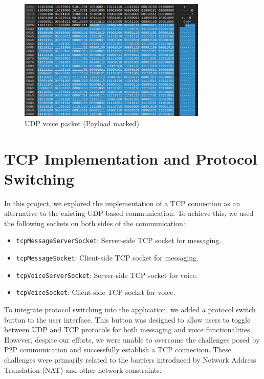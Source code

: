 \documentclass{article}
\begin{document}
\begin{figure}[h!]
    \centering
    \includegraphics[width=0.8\textwidth]{udp-voice-3.png}
    \caption{UDP voice packet (Payload marked)}
    \label{fig:udp-voice-3}
\end{figure}

\section{TCP Implementation and Protocol Switching}

In this project, we explored the implementation of a TCP connection as an alternative to the existing UDP-based communication. To achieve this, we used the following sockets on both sides of the communication:

\begin{itemize}
    \item \texttt{tcpMessageServerSocket}: Server-side TCP socket for messaging.
    \item \texttt{tcpMessageSocket}: Client-side TCP socket for messaging.
    \item \texttt{tcpVoiceServerSocket}: Server-side TCP socket for voice.
    \item \texttt{tcpVoiceSocket}: Client-side TCP socket for voice.
\end{itemize}

To integrate protocol switching into the application, we added a protocol switch button to the user interface. This button was designed to allow users to toggle between UDP and TCP protocols for both messaging and voice functionalities. However, despite our efforts, we were unable to overcome the challenges posed by P2P communication and successfully establish a TCP connection. These challenges were primarily related to the barriers introduced by Network Address Translation (NAT) and other network constraints.
\end{document}
